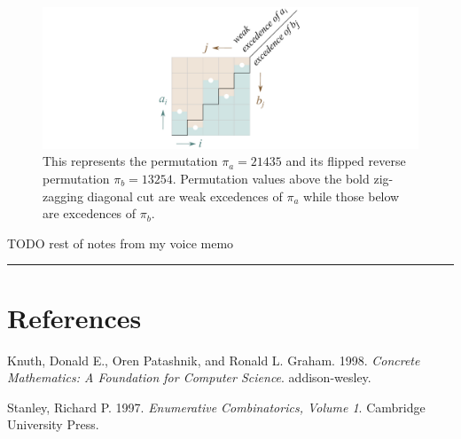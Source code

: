 \documentclass[]{article}
\begin{document}
\begin{figure}[htbp]
\centering
\includegraphics{images/pdfs/excedence.pdf}
\caption{\label{fig:excedence}This represents the permutation
\(\pi_a = 21435\) and its flipped reverse permutation \(\pi_b = 13254\).
Permutation values above the bold zig-zagging diagonal cut are weak
excedences of \(\pi_a\) while those below are excedences of
\(\pi_b\).}\label{fig:excedence}
\end{figure}

TODO rest of notes from my voice memo

\begin{center}\rule{0.5\linewidth}{\linethickness}\end{center}

\section*{References}\label{references}

\hypertarget{refs}{}
\hypertarget{ref-concrete}{}
Knuth, Donald E., Oren Patashnik, and Ronald L. Graham. 1998.
\emph{Concrete Mathematics: A Foundation for Computer Science}.
addison-wesley.

\hypertarget{ref-stanley}{}
Stanley, Richard P. 1997. \emph{Enumerative Combinatorics, Volume 1}.
Cambridge University Press.
\end{document}
